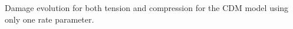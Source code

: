 \label{fig:concdam} Damage evolution for both tension and compression for the CDM
model using only one rate parameter.
